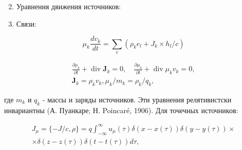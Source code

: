\documentclass[10pt]{article}
\begin{document}
\begin{enumerate}

  \setcounter{enumi}{1}

  \item Уравнения движения источников:



  \item Связи:



\end{enumerate}



\[

\mu_{k} \frac{d v_{k}}{d t}=\sum_{e}\left(\rho_{k} e_{l}+J_{k} \times h_{l} / c\right)

\]



\[

\begin{gathered}

\frac{\partial \rho_{k}}{\partial t}+\operatorname{div} \boldsymbol{J}_{k}=0, \quad \frac{\partial \mu_{k}}{\partial t}+\operatorname{div} \mu_{k} v_{k}=0, \\

\boldsymbol{J}_{k}=\rho_{k} v_{k}, \mu_{k} / m_{k}=\rho_{k} / q_{k},

\end{gathered}

\]



где $m_{k}$ и $q_{k}$ - массы и заряды источников. Эти уравнения релятивистски инвариантны (А. Пуанкаре; Н. Poincaré, 1906). Для точечных источников:



\[

\begin{gathered}

J_{\mu}=\{-J / c, \rho\}=q \int_{-\infty}^{\infty} u_{\mu}(\tau) \delta(x-x(\tau)) \delta(y-y(\tau)) \times \\

\times \delta(z-z(\tau)) \delta(t-t(\tau)) d \tau,

\end{gathered}

\]
\end{document}
